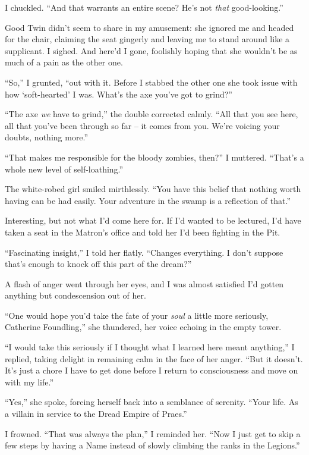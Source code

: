 \documentclass[12pt, openany]{book}
\begin{document}
I chuckled. “And that warrants an entire scene? He’s not \textit{that} good-looking.”

Good Twin didn’t seem to share in my amusement: she ignored me and headed for the chair, claiming the seat gingerly and leaving me to stand around like a supplicant. I sighed. And here’d I gone, foolishly hoping that she wouldn’t be as much of a pain as the other one.

“So,” I grunted, “out with it. Before I stabbed the other one she took issue with how ‘soft-hearted’ I was. What’s the axe you’ve got to grind?”

“The axe \textit{we} have to grind,” the double corrected calmly. “All that you see here, all that you’ve been through so far – it comes from you. We’re voicing your doubts, nothing more.”

“That makes me responsible for the bloody zombies, then?” I muttered. “That’s a whole new level of self-loathing.”

The white-robed girl smiled mirthlessly. “You have this belief that nothing worth having can be had easily. Your adventure in the swamp is a reflection of that.”

Interesting, but not what I’d come here for. If I’d wanted to be lectured, I’d have taken a seat in the Matron’s office and told her I’d been fighting in the Pit.

“Fascinating insight,” I told her flatly. “Changes everything. I don’t suppose that’s enough to knock off this part of the dream?”

A flash of anger went through her eyes, and I was almost satisfied I’d gotten anything but condescension out of her.

“One would hope you’d take the fate of your \textit{soul} a little more seriously, Catherine Foundling,” she thundered, her voice echoing in the empty tower.

“I would take this seriously if I thought what I learned here meant anything,” I replied, taking delight in remaining calm in the face of her anger. “But it doesn’t. It’s just a chore I have to get done before I return to consciousness and move on with my life.”

“Yes,” she spoke, forcing herself back into a semblance of serenity. “Your life. As a villain in service to the Dread Empire of Praes.”

I frowned. “That was always the plan,” I reminded her. “Now I just get to skip a few steps by having a Name instead of slowly climbing the ranks in the Legions.”
\end{document}
